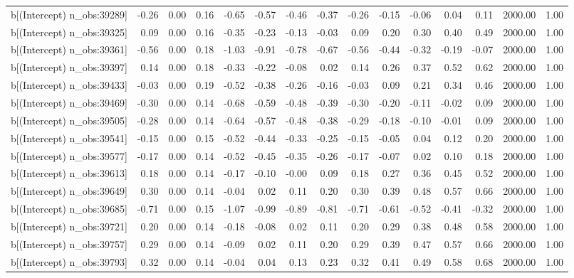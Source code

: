 \begin{table}[ht]
\begin{tabular}{rrrrrrrrrrrrrrr}
  b[(Intercept) n\_obs:39289] & -0.26 & 0.00 & 0.16 & -0.65 & -0.57 & -0.46 & -0.37 & -0.26 & -0.15 & -0.06 & 0.04 & 0.11 & 2000.00 & 1.00 \\ 
  b[(Intercept) n\_obs:39325] & 0.09 & 0.00 & 0.16 & -0.35 & -0.23 & -0.13 & -0.03 & 0.09 & 0.20 & 0.30 & 0.40 & 0.49 & 2000.00 & 1.00 \\ 
  b[(Intercept) n\_obs:39361] & -0.56 & 0.00 & 0.18 & -1.03 & -0.91 & -0.78 & -0.67 & -0.56 & -0.44 & -0.32 & -0.19 & -0.07 & 2000.00 & 1.00 \\ 
  b[(Intercept) n\_obs:39397] & 0.14 & 0.00 & 0.18 & -0.33 & -0.22 & -0.08 & 0.02 & 0.14 & 0.26 & 0.37 & 0.52 & 0.62 & 2000.00 & 1.00 \\ 
  b[(Intercept) n\_obs:39433] & -0.03 & 0.00 & 0.19 & -0.52 & -0.38 & -0.26 & -0.16 & -0.03 & 0.09 & 0.21 & 0.34 & 0.46 & 2000.00 & 1.00 \\ 
  b[(Intercept) n\_obs:39469] & -0.30 & 0.00 & 0.14 & -0.68 & -0.59 & -0.48 & -0.39 & -0.30 & -0.20 & -0.11 & -0.02 & 0.09 & 2000.00 & 1.00 \\ 
  b[(Intercept) n\_obs:39505] & -0.28 & 0.00 & 0.14 & -0.64 & -0.57 & -0.48 & -0.38 & -0.29 & -0.18 & -0.10 & -0.01 & 0.09 & 2000.00 & 1.00 \\ 
  b[(Intercept) n\_obs:39541] & -0.15 & 0.00 & 0.15 & -0.52 & -0.44 & -0.33 & -0.25 & -0.15 & -0.05 & 0.04 & 0.12 & 0.20 & 2000.00 & 1.00 \\ 
  b[(Intercept) n\_obs:39577] & -0.17 & 0.00 & 0.14 & -0.52 & -0.45 & -0.35 & -0.26 & -0.17 & -0.07 & 0.02 & 0.10 & 0.18 & 2000.00 & 1.00 \\ 
  b[(Intercept) n\_obs:39613] & 0.18 & 0.00 & 0.14 & -0.17 & -0.10 & -0.00 & 0.09 & 0.18 & 0.27 & 0.36 & 0.45 & 0.52 & 2000.00 & 1.00 \\ 
  b[(Intercept) n\_obs:39649] & 0.30 & 0.00 & 0.14 & -0.04 & 0.02 & 0.11 & 0.20 & 0.30 & 0.39 & 0.48 & 0.57 & 0.66 & 2000.00 & 1.00 \\ 
  b[(Intercept) n\_obs:39685] & -0.71 & 0.00 & 0.15 & -1.07 & -0.99 & -0.89 & -0.81 & -0.71 & -0.61 & -0.52 & -0.41 & -0.32 & 2000.00 & 1.00 \\ 
  b[(Intercept) n\_obs:39721] & 0.20 & 0.00 & 0.14 & -0.18 & -0.08 & 0.02 & 0.11 & 0.20 & 0.29 & 0.38 & 0.48 & 0.58 & 2000.00 & 1.00 \\ 
  b[(Intercept) n\_obs:39757] & 0.29 & 0.00 & 0.14 & -0.09 & 0.02 & 0.11 & 0.20 & 0.29 & 0.39 & 0.47 & 0.57 & 0.66 & 2000.00 & 1.00 \\ 
  b[(Intercept) n\_obs:39793] & 0.32 & 0.00 & 0.14 & -0.04 & 0.04 & 0.13 & 0.23 & 0.32 & 0.41 & 0.49 & 0.58 & 0.68 & 2000.00 & 1.00 \\ 

\end{tabular}
\end{table}
